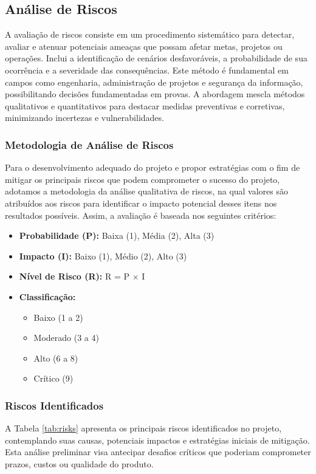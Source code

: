 \documentclass[a4paper, 12pt]{article}
\begin{document}
\subsection{Análise de Riscos}

A avaliação de riscos consiste em um procedimento sistemático para detectar, avaliar e atenuar potenciais ameaças que possam afetar metas, projetos ou operações. Inclui a identificação de cenários desfavoráveis, a probabilidade de sua ocorrência e a severidade das consequências. Este método é fundamental em campos como engenharia, administração de projetos e segurança da informação, possibilitando decisões fundamentadas em provas. A abordagem mescla métodos qualitativos e quantitativos para destacar medidas preventivas e corretivas, minimizando incertezas e vulnerabilidades.

\subsubsection{Metodologia de Análise de Riscos}

Para o desenvolvimento adequado do projeto e propor estratégias com o fim de mitigar os principais riscos que podem comprometer o sucesso do projeto, adotamos a metodologia da análise qualitativa de riscos, na qual valores são atribuídos aos riscos para identificar o impacto potencial desses itens nos resultados possíveis. Assim, a avaliação é baseada nos seguintes critérios:

\begin{itemize}
    \item \textbf{Probabilidade (P):} Baixa (1), Média (2), Alta (3)
    \item \textbf{Impacto (I):} Baixo (1), Médio (2), Alto (3)
    \item \textbf{Nível de Risco (R):} R = P × I
    \item \textbf{Classificação:}
    \begin{itemize}
        \item Baixo (1 a 2)
        \item Moderado (3 a 4)
        \item Alto (6 a 8)
        \item Crítico (9)
    \end{itemize}
\end{itemize}

\subsubsection{Riscos Identificados}
A Tabela \ref{tab:risks} apresenta os principais riscos identificados no projeto, contemplando suas causas, potenciais impactos e estratégias iniciais de mitigação. Esta análise preliminar visa antecipar desafios críticos que poderiam comprometer prazos, custos ou qualidade do produto. 
\end{document}
